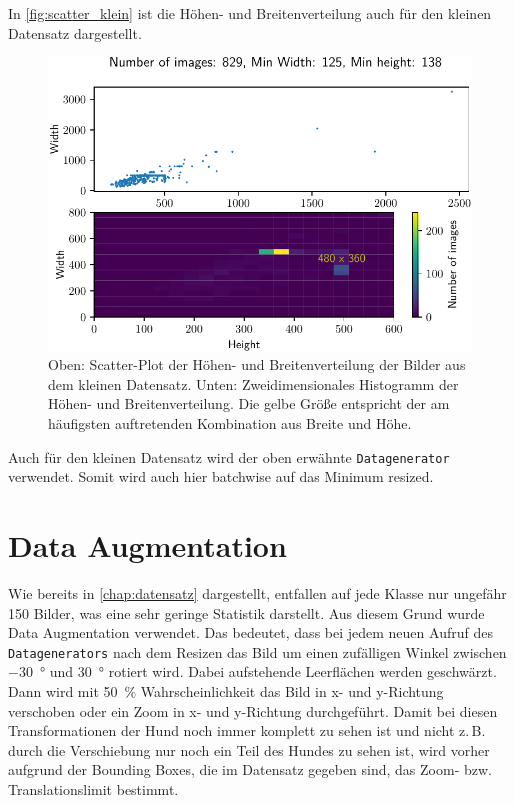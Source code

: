 In \autoref{fig:scatter_klein} ist die Höhen- und Breitenverteilung auch für
den kleinen Datensatz dargestellt.

\begin{figure}
  \centering
  \includegraphics[scale=0.9]{pics/width_height_scatter_hist2d_klein.pdf}
  \caption{Oben: Scatter-Plot der Höhen- und Breitenverteilung der Bilder aus
  dem kleinen Datensatz.
  Unten: Zweidimensionales Histogramm der Höhen- und Breitenverteilung.
  Die gelbe Größe entspricht der am häufigsten auftretenden Kombination
  aus Breite und Höhe.}
  \label{fig:scatter_klein}
\end{figure}

Auch für den kleinen Datensatz wird der oben erwähnte \texttt{Datagenerator}
verwendet. Somit wird auch hier batchwise auf das Minimum resized.

\section{Data Augmentation}
Wie bereits in \autoref{chap:datensatz} dargestellt, entfallen auf jede Klasse
nur ungefähr 150 Bilder, was eine sehr geringe Statistik darstellt. Aus diesem
Grund wurde Data Augmentation verwendet. Das bedeutet, dass bei jedem neuen
Aufruf des \texttt{Datagenerators} nach dem Resizen das Bild um einen zufälligen
Winkel zwischen \SI{-30}{\degree} und \SI{30}{\degree} rotiert wird. Dabei
aufstehende Leerflächen werden geschwärzt. Dann wird mit \SI{50}{\percent}
Wahrscheinlichkeit das Bild in x- und y-Richtung verschoben oder ein Zoom in x-
und y-Richtung durchgeführt. Damit bei diesen Transformationen der Hund noch
immer komplett zu sehen ist und nicht z.\,B. durch die Verschiebung nur noch ein
Teil des Hundes zu sehen ist, wird vorher aufgrund der Bounding Boxes, die im
Datensatz gegeben sind, das Zoom- bzw. Translationslimit bestimmt.

